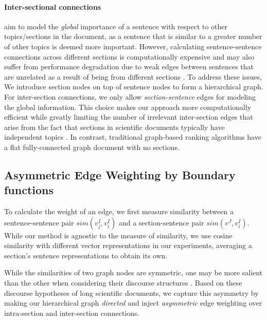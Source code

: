 \documentclass[11pt,a4paper]{article}
\begin{document}
\paragraph{Inter-sectional connections}
aim to model the \textit{global} importance of a sentence with respect to other topics/sections in the document, as a sentence that is similar to a greater number of other topics is deemed more important. However, calculating sentence-sentence connections across different sections is computationally expensive and may also suffer from performance degradation due to weak edges between sentences that are unrelated as a result of being from different sections \citep{mihalcea2004textrank}. To address these issues, We introduce section nodes on top of sentence nodes to form a hierarchical graph. For inter-section connections, we only allow \textit{section-sentence} edges for modeling the global information. This choice makes our approach more computationally efficient while greatly limiting the number of irrelevant inter-section edges that arise from the fact that sections in scientific documents typically have independent topics \citep{xiao2019extractive}.  In contrast, traditional graph-based ranking algorithms have a flat fully-connected graph document with no sections.

\subsection{Asymmetric Edge Weighting by Boundary functions}\label{sub-sec:method_edgeweights}
To calculate the weight of an edge, we first measure similarity between a sentence-sentence pair  $sim({v^I_{j}, v^I_{i}})$ and a section-sentence pair $sim(v^J,v^I_i)$. While our method is agnostic to the measure of similarity, we use cosine similarity with different vector representations in our experiments, averaging a section's sentence representations to obtain its own. 

While the similarities of two graph nodes are symmetric, one may be more salient than the other when considering  their discourse structures \citep{baxendale1958machine,teufel1997sentence}.  Based on these discourse hypotheses of long scientific documents, we capture this asymmetry by making
our hierarchical graph \textit{directed} and inject \textit{asymmetric} edge weighting over intra-section and inter-section connections. 
\end{document}
